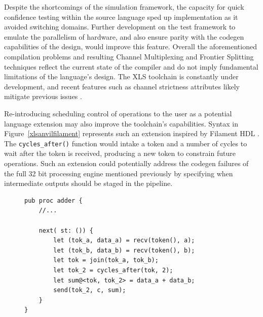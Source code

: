 

Despite the shortcomings of the simulation framework, the capacity for quick confidence testing within the source language sped up implementation as it avoided switching domains. Further development on the test framework to emulate the parallelism of hardware, and also ensure parity with the codegen capabilities of the design, would improve this feature. Overall the aforementioned compilation problems and resulting Channel Multiplexing and Frontier Splitting techniques reflect the current state of the compiler and do not imply fundamental limitations of the language's design. The XLS toolchain is constantly under development, and recent features such as channel strictness attributes likely mitigate previous issues \cite{xlsweb}.

Re-introducing scheduling control of operations to the user as a potential language extension may also improve the toolchain's capabilities. Syntax in Figure~\ref{xlsanvilfilament} represents such an extension inspired by Filament HDL \cite{filament}. The \lstinline[style=mystyle]|cycles_after()| function would intake a token and a number of cycles to wait after the token is received, producing a new token to constrain future operations. Such an extension could potentially address the codegen failures of the full 32 bit processing engine mentioned previously by specifying when intermediate outputs should be staged in the pipeline.

\begin{figure}[H]
\begin{lstlisting}[label={xlsanvilfilament}, caption=Reintroducing scheduling control to the user by extending the capabilities of tokens, captionpos=b, style=mystyle]
pub proc adder {
    //...

    next( st: ()) {
        let (tok_a, data_a) = recv(token(), a);
        let (tok_b, data_b) = recv(token(), b);
        let tok = join(tok_a, tok_b);
        let tok_2 = cycles_after(tok, 2);
        let sum@<tok, tok_2> = data_a + data_b;
        send(tok_2, c, sum);
    }
}
\end{lstlisting}
\end{figure}


